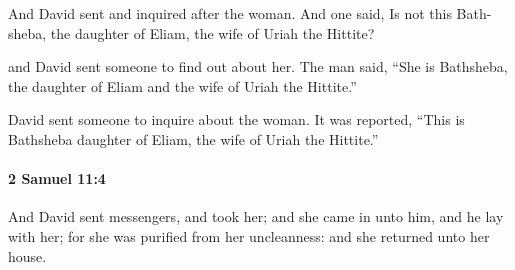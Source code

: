 			\begin{versebox}
					\item[BHS] 
					\item[ASV] And David sent and inquired after the woman. And one said, Is not this Bath-sheba, the daughter of Eliam, the wife of Uriah the Hittite?
					\item[NIV] and David sent someone to find out about her. The man said, “She is Bathsheba, the daughter of Eliam and the wife of Uriah the Hittite.”
					\item[NRSV] David sent someone to inquire about the woman. It was reported, “This is Bathsheba daughter of Eliam, the wife of Uriah the Hittite.”
			\end{versebox}

		\paragraph{2 Samuel 11:4} %
			\label{2SAMUEL-11-4}

			And David sent messengers, and took her; and she came in unto him, and he lay with her; for she was purified from her uncleanness: and she returned unto her house.

